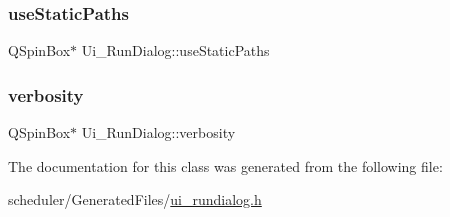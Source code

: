 \mbox{\label{class_ui___run_dialog_a7958c3fb469fe573f9bcf73430beb0b3}} 
\subsubsection{\texorpdfstring{useStaticPaths}{useStaticPaths}}
{\footnotesize\ttfamily Q\+Spin\+Box$\ast$ Ui\+\_\+\+Run\+Dialog\+::use\+Static\+Paths}

\mbox{\label{class_ui___run_dialog_a42187baf1b2ed195c91c205f5767fe9d}} 
\subsubsection{\texorpdfstring{verbosity}{verbosity}}
{\footnotesize\ttfamily Q\+Spin\+Box$\ast$ Ui\+\_\+\+Run\+Dialog\+::verbosity}



The documentation for this class was generated from the following file\+:\begin{DoxyCompactItemize}
\item 
scheduler/\+Generated\+Files/\mbox{\hyperlink{ui__rundialog_8h}{ui\+\_\+rundialog.\+h}}\end{DoxyCompactItemize}
